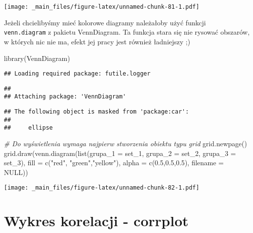 \documentclass[
]{book}
\newenvironment{Shaded}{\begin{snugshade}}{\end{snugshade}}
\newcommand{\AttributeTok}[1]{\textcolor[rgb]{0.77,0.63,0.00}{#1}}
\newcommand{\CommentTok}[1]{\textcolor[rgb]{0.56,0.35,0.01}{\textit{#1}}}
\newcommand{\ConstantTok}[1]{\textcolor[rgb]{0.00,0.00,0.00}{#1}}
\newcommand{\FloatTok}[1]{\textcolor[rgb]{0.00,0.00,0.81}{#1}}
\newcommand{\FunctionTok}[1]{\textcolor[rgb]{0.00,0.00,0.00}{#1}}
\newcommand{\NormalTok}[1]{#1}
\newcommand{\StringTok}[1]{\textcolor[rgb]{0.31,0.60,0.02}{#1}}
\begin{document}
\texttt{[image: \_main\_files/figure-latex/unnamed-chunk-81-1.pdf]}

Jeżeli chcielibyśmy mieć kolorowe diagramy należałoby użyć funkcji \texttt{venn.diagram} z pakietu VennDiagram. Ta funkcja stara się nie rysować obszarów, w których nic nie ma, efekt jej pracy jest również ładniejszy ;)

\begin{Shaded}
\begin{Highlighting}[]
\FunctionTok{library}\NormalTok{(VennDiagram)}
\end{Highlighting}
\end{Shaded}

\begin{verbatim}
## Loading required package: futile.logger
\end{verbatim}

\begin{verbatim}
## 
## Attaching package: 'VennDiagram'
\end{verbatim}

\begin{verbatim}
## The following object is masked from 'package:car':
## 
##     ellipse
\end{verbatim}

\begin{Shaded}
\begin{Highlighting}[]
\CommentTok{\# Do wyświetlenia wymaga najpierw stworzenia obiektu typu grid}
\FunctionTok{grid.newpage}\NormalTok{()}
\FunctionTok{grid.draw}\NormalTok{(}\FunctionTok{venn.diagram}\NormalTok{(}\FunctionTok{list}\NormalTok{(}\AttributeTok{grupa\_1 =}\NormalTok{ set\_1, }\AttributeTok{grupa\_2 =}\NormalTok{ set\_2, }\AttributeTok{grupa\_3 =}\NormalTok{ set\_3), }
                       \AttributeTok{fill =} \FunctionTok{c}\NormalTok{(}\StringTok{"red"}\NormalTok{, }\StringTok{"green"}\NormalTok{,}\StringTok{"yellow"}\NormalTok{), }
                       \AttributeTok{alpha =} \FunctionTok{c}\NormalTok{(}\FloatTok{0.5}\NormalTok{,}\FloatTok{0.5}\NormalTok{,}\FloatTok{0.5}\NormalTok{), }
                       \AttributeTok{filename =} \ConstantTok{NULL}\NormalTok{))}
\end{Highlighting}
\end{Shaded}

\texttt{[image: \_main\_files/figure-latex/unnamed-chunk-82-1.pdf]}

\hypertarget{wykres-korelacji---corrplot}{%
\section{Wykres korelacji - corrplot}\label{wykres-korelacji---corrplot}}
\end{document}
